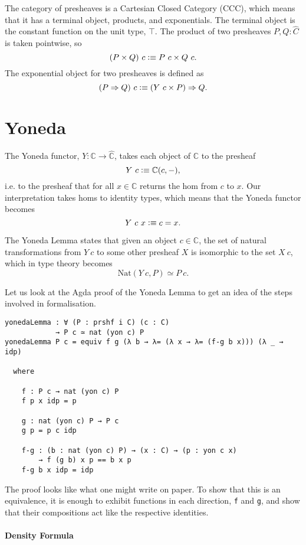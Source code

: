 \documentclass[12pt, parskip, DIV=14]{scrbook}
\newcommand{\defeq}{\vcentcolon\equiv}
\begin{document}
The category of presheaves is a Cartesian Closed Category (CCC), which means that it has a terminal object, products, and exponentials. The terminal object is the constant function on the unit type, $\top$. The product of two presheaves $P , Q : \widehat{C}$ is taken pointwise, so $$(P \times Q)~c \defeq P~c \times Q~c.$$ The exponential object for two presheaves is defined as $$(P \Rightarrow Q)~c \defeq (Y~c \times P) \Rightarrow Q.$$


\section{Yoneda}

The Yoneda functor, $Y : \mathbb{C} \to \widehat{\mathbb{C}}$, takes each object of $\mathbb{C}$ to the presheaf $$Y~c \defeq \mathbb{C}(c,-),$$ i.e. to the presheaf that for all $x \in \mathbb{C}$ returns the hom from $c$ to $x$. Our interpretation takes homs to identity types, which means that the Yoneda functor becomes $$Y~c~x \vcentcolon\equiv c = x.$$

The Yoneda Lemma states that given an object $c \in \mathbb{C}$, the set of natural transformations from $Y~c$ to some other presheaf $X$ is isomorphic to the set $X~c$, which in type theory becomes $$\mathrm{Nat}(Y~c , P) \simeq P~c.$$

Let us look at the Agda proof of the Yoneda Lemma to get an idea of the steps involved in formalisation.

\begin{verbatim}
yonedaLemma : ∀ (P : prshf i C) (c : C)
            → P c ≃ nat (yon c) P
yonedaLemma P c = equiv f g (λ b → λ= (λ x → λ= (f-g b x))) (λ _ → idp)

  where

    f : P c → nat (yon c) P
    f p x idp = p

    g : nat (yon c) P → P c
    g p = p c idp

    f-g : (b : nat (yon c) P) → (x : C) → (p : yon c x)
        → f (g b) x p == b x p
    f-g b x idp = idp
\end{verbatim}

The proof looks like what one might write on paper. To show that this is an equivalence, it is enough to exhibit functions in each direction, \texttt{f} and \texttt{g}, and show that their compositions act like the respective identities.

\paragraph{Density Formula}
\end{document}

